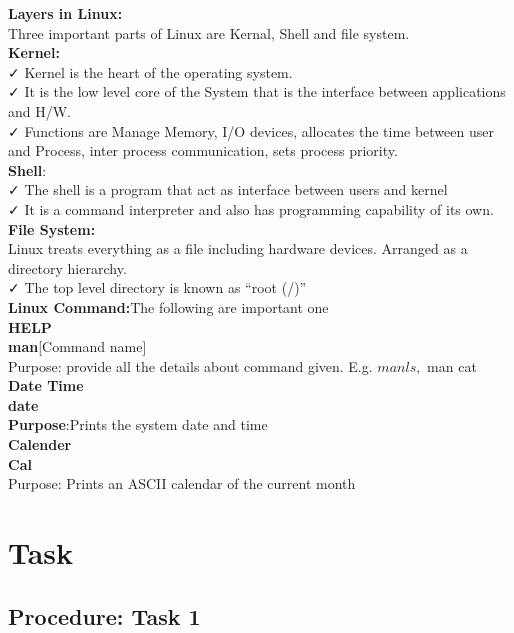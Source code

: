 ﻿\documentclass[11pt]{article}            %
\begin{document}
\textbf{Layers  in Linux:}\\
Three important parts of Linux are Kernal, Shell and file system. \\


\textbf{Kernel:}\\
                    ✓ Kernel is the heart of the operating system.\\
                     ✓ It is the low level core of the System that is the interface between applications and H/W.\\
                     ✓ Functions  are Manage Memory, I/O devices, allocates the time between user and         Process, inter process communication, sets process priority.\\

\textbf{Shell}:\\
✓ The shell is a program that act as interface between  users and kernel \\
 ✓ It is a command interpreter and also has programming capability of its own.\\

\textbf{File System:}\\
Linux treats everything as a file including hardware devices. Arranged as a directory hierarchy.  \\
✓ The top level directory is known as “root (/)”\\

\textbf{Linux Command:}The following are important one\\
\textbf{HELP}\\
\textbf{ man}[Command name]\\
Purpose: provide all the details about command given. E.g. $ man ls, $ man cat\\
\textbf{Date Time}\\
\textbf{date}\\
\textbf{Purpose}:Prints the system date and time\\
\textbf{Calender}\\
\textbf{Cal}\\
Purpose: Prints an ASCII calendar of the current month




\section{Task}  
\subsection{Procedure: Task 1 }     
\end{document}
